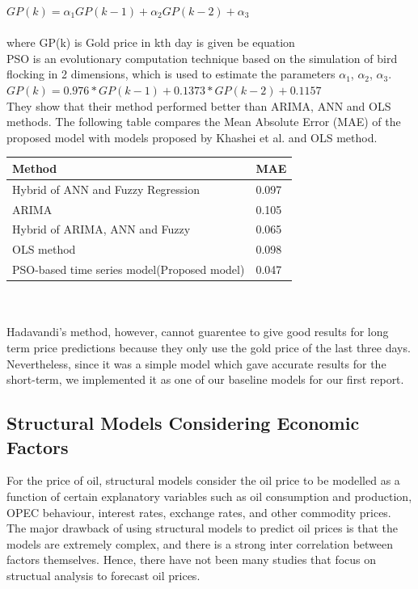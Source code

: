 \documentclass[runningheads]{llncs}
\begin{document}
${GP(k) = \alpha_1  GP(k-1) + \alpha_2GP(k-2)+ \alpha_3}$ \\\\
where GP(k) is Gold price in kth day is given be equation \\

\noindent PSO is an evolutionary computation technique based on the simulation of bird flocking in 2 dimensions, which is used to estimate the parameters $\alpha_1$, $\alpha_2$, $\alpha_3$. \\

${GP(k) = 0.976*GP(k-1) + 0.1373*GP(k-2)+ 0.1157}$ \\

\noindent They show that their method performed  better than ARIMA, ANN and OLS methods\cite{gold-ref1}. The following table compares the Mean Absolute Error (MAE) of the proposed model with models proposed by Khashei et al. \cite{gold-ref2} and OLS method. \\

\begin{tabular}{|l|l|}
\hline
Method & MAE \\ \hline
Hybrid of ANN and Fuzzy Regression \cite{gold-ref2} & 0.097 \\ \hline
ARIMA \cite{gold-ref2} & 0.105 \\ \hline
Hybrid of ARIMA, ANN and Fuzzy \cite{gold-ref1} & 0.065 \\ \hline
OLS method & 0.098 \\ \hline
PSO-based time series model(Proposed model) & 0.047 \\ \hline
\end{tabular} \\ \\

\noindent Hadavandi's method, however, cannot guarentee to give good results for long term price predictions because they only use the gold price of the last three days. Nevertheless, since it was a simple model which gave accurate results for the short-term, we implemented it as one of our baseline models for our first report.

\subsection{Structural Models Considering Economic Factors}

For the price of oil, structural models consider the oil price to be modelled as a function of certain explanatory variables such as oil consumption and production, OPEC behaviour, interest rates, exchange rates, and other commodity prices. The major drawback of using structural models to predict oil prices is that the models are extremely complex, and there is a strong inter correlation between factors themselves. Hence, there have not been many studies that focus on structual analysis to forecast oil prices.\\
\end{document}
